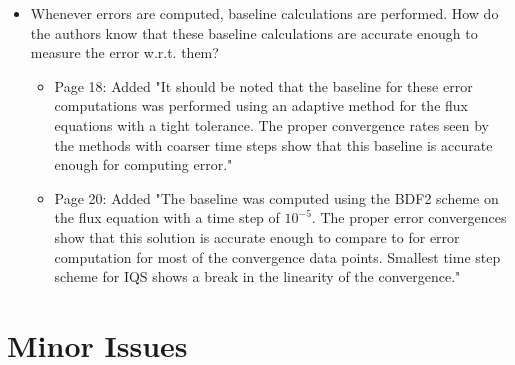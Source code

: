 \documentclass{elsarticle}
\newcommand{\done}{\checkmark}
\newcommand{\medm}[1]{\textcolor{BurntOrange}{#1}}
\begin{document}
\begin{itemize}
{\begin{tikzpicture}[every node/.style = {font=\normalsize}]
\end{tikzpicture}%
}

\item[\done] \medm{  Whenever errors are computed, baseline calculations are performed. How do the authors know that these baseline calculations are accurate enough to measure the error w.r.t. them? }
\begin{itemize}
\item Page 18: Added "It should be noted that the baseline for these error computations was performed using an adaptive method for the flux equations with a tight tolerance. The proper convergence rates seen by the methods with coarser time steps show that this baseline is accurate enough for computing error."
\item Page 20: Added "The baseline was computed using the BDF2 scheme on the flux equation with a time step of $10^{-5}$. The proper error convergences show that this solution is accurate enough to compare to for error computation for most of the convergence data points. Smallest time step scheme for IQS shows a break in the linearity of the convergence."
\end{itemize}

\end{itemize}

\section*{Minor Issues}
\end{document}
